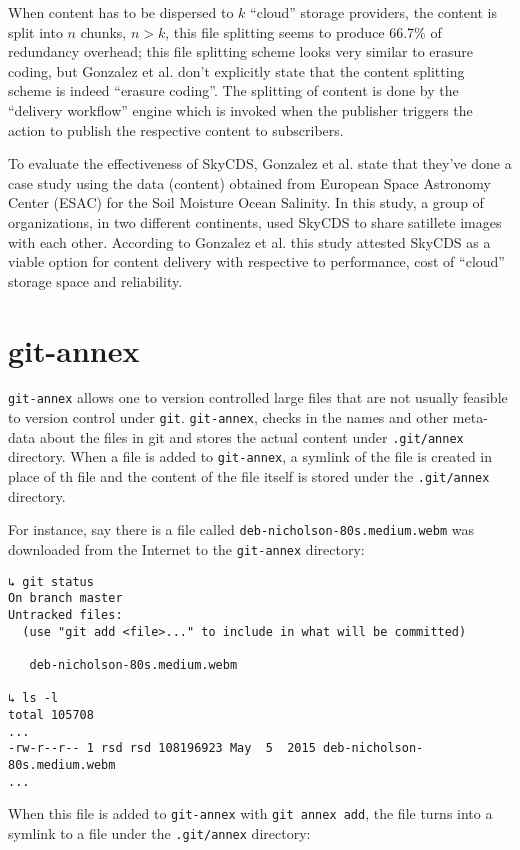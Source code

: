When content has to be dispersed to $k$ ``cloud'' storage providers,
the content is split into $n$ chunks, $n > k$, this file splitting
seems to produce 66.7\% of redundancy overhead\cite{skycds}; this file
splitting scheme looks very similar to erasure coding, but Gonzalez et
al. don't explicitly state that the content splitting scheme is indeed
``erasure coding''. The splitting of content is done by the ``delivery
workflow'' engine which is invoked when the publisher triggers the
action to publish the respective content to subscribers.

To evaluate the effectiveness of SkyCDS, Gonzalez et al. state that
they've done a case study using the data (content) obtained from
European Space Astronomy Center (ESAC) for the Soil Moisture Ocean
Salinity. In this study, a group of organizations, in two different
continents, used SkyCDS to share satillete images with each
other. According to Gonzalez et al. this study attested SkyCDS as a
viable option for content delivery with respective to performance,
cost of ``cloud'' storage space and reliability.

\section{git-annex}\label{2-gitannex-sec}

\verb+git-annex+ allows one to version controlled large files that are
not usually feasible to version control under
\verb+git+\cite{program:git}. \verb+git-annex+, checks in the names
and other meta-data about the files in git and stores the actual
content under \verb+.git/annex+ directory. When a file is added to
\verb+git-annex+, a symlink of the file is created in place of th file
and the content of the file itself is stored under the
\verb+.git/annex+ directory.

For instance, say there is a file called
\verb+deb-nicholson-80s.medium.webm+ was downloaded from the Internet
to the \verb+git-annex+ directory:

\begin{verbatim}
↳ git status
On branch master
Untracked files:
  (use "git add <file>..." to include in what will be committed)

   deb-nicholson-80s.medium.webm

↳ ls -l
total 105708
...
-rw-r--r-- 1 rsd rsd 108196923 May  5  2015 deb-nicholson-80s.medium.webm
...
\end{verbatim}

When this file is added to \verb+git-annex+ with \verb+git annex add+,
the file turns into a symlink to a file under the \verb+.git/annex+
directory:

